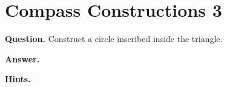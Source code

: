 \documentclass{article}
\begin{document}
\section*{Compass Constructions 3}
\textbf{Question.} Construct a circle inscribed inside the triangle.

\textbf{Answer.} 

\textbf{Hints.}
\begin{itemize}

\end{itemize}
\end{document}
